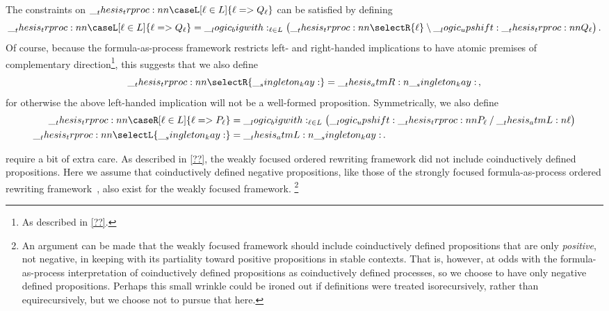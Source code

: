 The constraints on $\trproc{\caseL[\ell \in L]{\ell => Q_{\ell}}}$ can be satisfied by defining
\begin{gather*}
  \trproc{\caseL[\ell \in L]{\ell => Q_{\ell}}}
    = \bigwith_{\ell \in L}\bigl(\trproc{\selectR{\ell}} \limp \up \trproc{Q_{\ell}}\bigr)
  \,.
\end{gather*}
Of course, because the formula-as-process framework restricts left- and right-handed implications to have atomic premises of complementary direction\footnote{As described in \cref{??}.}, this suggests that we also define
\begin{equation*}
  \trproc{\selectR{\kay}} = \atmR{\kay}
  \,,
\end{equation*}
for otherwise the above left-handed implication will not be a well-formed proposition.
Symmetrically, we also define 
\begin{align*}
  \trproc{\caseR[\ell \in L]{\ell => P_{\ell}}} &= \bigwith_{\ell \in L}\bigl(\up \trproc{P_{\ell}} \pmir \atmL{\ell}\bigr) \\
  \trproc{\selectL{\kay}} &= \atmL{\kay}
  \,.
\end{align*}

 require a bit of extra care.
As described in \cref{??}, the weakly focused ordered rewriting framework did not include coinductively defined propositions.
Here we assume that coinductively defined negative propositions, like those of the strongly focused formula-as-process ordered rewriting framework~, also exist for the weakly focused framework.%
\footnote{An argument can be made that the weakly focused framework should include coinductively defined propositions that are only \emph{positive}, not negative, in keeping with its partiality toward positive propositions in stable contexts.
  That is, however, at odds with the formula-as-process interpretation of coinductively defined propositions as coinductively defined processes, so we choose to have only negative defined propositions.
  Perhaps this small wrinkle could be ironed out if definitions were treated iso\-re\-cur\-sive\-ly, rather than equi\-re\-cur\-sive\-ly, but we choose not to pursue that here.}

